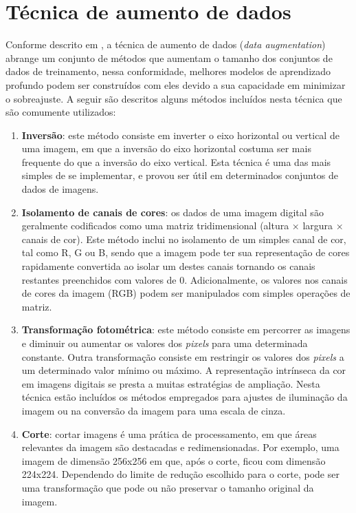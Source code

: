 \documentclass[
	12pt,				%
	oneside,			%
	a4paper,			%
	english,			%
	brazil				%
	]{abntex2ppgsi}
\begin{document}
\section{Técnica de aumento de dados}
Conforme descrito em , a técnica de aumento de dados (\textit{data augmentation}) abrange um conjunto de métodos que aumentam o tamanho dos conjuntos de dados de treinamento, nessa conformidade, melhores modelos de aprendizado profundo podem ser construídos com eles devido a sua capacidade em minimizar o sobreajuste. A seguir são descritos alguns métodos incluídos nesta técnica que são comumente utilizados:

\begin{enumerate}
  \item \textbf{Inversão}: este método consiste em inverter o eixo horizontal ou vertical de uma imagem, em que a inversão do eixo horizontal costuma ser mais frequente do que a inversão do eixo vertical. Esta técnica é uma das mais simples de se implementar, e provou ser útil em determinados conjuntos de dados de imagens.
  
  \item \textbf{Isolamento de canais de cores}: os dados de uma imagem digital são geralmente codificados como uma matriz tridimensional (altura × largura × canais de cor). Este método inclui no isolamento de um simples canal de cor, tal como R, G ou B, sendo que a imagem pode ter sua representação de cores rapidamente convertida ao isolar um destes canais tornando os canais restantes preenchidos com valores de 0. Adicionalmente, os valores nos canais de cores da imagem (RGB) podem ser manipulados com simples operações de matriz.
  
  \item \textbf{Transformação fotométrica}: este método consiste em percorrer as imagens e diminuir ou aumentar os valores dos \textit{pixels} para uma determinada constante. Outra transformação consiste em restringir os valores dos \textit{pixels} a um determinado valor mínimo ou máximo. A representação intrínseca da cor em imagens digitais se presta a muitas estratégias de ampliação. Nesta técnica estão incluídos os métodos empregados para ajustes de iluminação da imagem ou na conversão da imagem para uma escala de cinza.
  
  \item \textbf{Corte}: cortar imagens é uma prática de processamento, em que áreas relevantes da imagem são destacadas e redimensionadas. Por exemplo, uma imagem de dimensão 256x256 em que, após o corte, ficou com dimensão 224x224. Dependendo do limite de redução escolhido para o corte, pode ser uma transformação que pode ou não preservar o tamanho original da imagem.
  

\end{enumerate}
\end{document}
